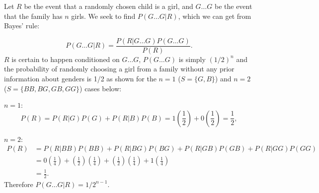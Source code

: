 \begin{problem}{39} Let $R$ be the event that a randomly chosen child is a girl, and $G\ldots G$ be the event that the family has $n$ girls.  We seek to find $P(G\ldots G|R)$, which we can get from Bayes' rule:

\begin{equation*}
P(G\ldots G|R) = \frac{P(R|G\ldots G) P(G\ldots G) }{P(R)}.
\end{equation*}
$R$ is certain to happen conditioned on $G\ldots G$, $P(G\ldots G)$ is simply $(1/2)^n$ and the probability of randomly choosing a girl from a family without any prior information about genders is 1/2 as shown for the $n=1$ ($S=\{G,  B\}$) and $n=2$ ($S=\{BB, BG, GB, GG\}$) cases below:

$n=1:$
\begin{equation*}
P(R) = P(R|G)P(G)+P(R|B)P(B) = 1\left (\frac{1}{2}\right)+0\left(\frac{1}{2}\right) = \frac{1}{2},
\end{equation*}

$n=2:$
\begin{align*}
P(R) &= P(R|BB)P(BB)+P(R|BG)P(BG) +P(R|GB)P(GB)+P(R|GG)P(GG) \\
&= 0\left (\frac{1}{4}\right)+\left (\frac{1}{2}\right)\left (\frac{1}{4}\right) +\left (\frac{1}{2}\right)\left (\frac{1}{4}\right) +1\left (\frac{1}{4}\right) \\
&= \frac{1}{2}.
\end{align*}
Therefore $P(G\ldots G|R) = 1/2^{n-1}$.



\end{problem}










  

